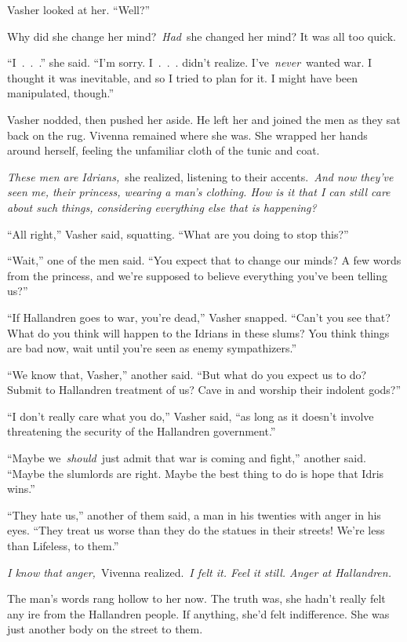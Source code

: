 Vasher looked at her. “Well?”

Why did she change her mind?~\textit{Had}~she changed her mind? It was all too quick.

“I~.~.~.” she said. “I’m sorry. I~.~.~. didn’t realize. I’ve~\textit{never}~wanted war. I thought it was inevitable, and so I tried to plan for it. I might have been manipulated, though.”

Vasher nodded, then pushed her aside. He left her and joined the men as they sat back on the rug. Vivenna remained where she was. She wrapped her hands around herself, feeling the unfamiliar cloth of the tunic and coat.

\textit{These men are Idrians,}~she realized, listening to their accents.~\textit{And now they’ve seen me, their princess, wearing a man’s clothing. How is it that I can still care about such things, considering everything else that is happening?}

“All right,” Vasher said, squatting. “What are you doing to stop this?”

“Wait,” one of the men said. “You expect that to change our minds? A few words from the princess, and we’re supposed to believe everything you’ve been telling us?”

“If Hallandren goes to war, you’re dead,” Vasher snapped. “Can’t you see that? What do you think will happen to the Idrians in these slums? You think things are bad now, wait until you’re seen as enemy sympathizers.”

“We know that, Vasher,” another said. “But what do you expect us to do? Submit to Hallandren treatment of us? Cave in and worship their indolent gods?”

“I don’t really care what you do,” Vasher said, “as long as it doesn’t involve threatening the security of the Hallandren government.”

“Maybe we~\textit{should}~just admit that war is coming and fight,” another said. “Maybe the slumlords are right. Maybe the best thing to do is hope that Idris wins.”

“They hate us,” another of them said, a man in his twenties with anger in his eyes. “They treat us worse than they do the statues in their streets! We’re less than Lifeless, to them.”

\textit{I know that anger,}~Vivenna realized.~\textit{I felt it. Feel it still. Anger at Hallandren.}

The man’s words rang hollow to her now. The truth was, she hadn’t really felt any ire from the Hallandren people. If anything, she’d felt indifference. She was just another body on the street to them.

